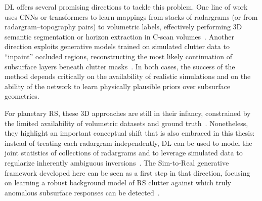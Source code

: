 DL offers several promising directions to tackle this problem.
One line of work uses CNNs or transformers to learn mappings from stacks of radargrams (or from radargram–topography pairs) to volumetric labels, effectively performing 3D semantic segmentation or horizon extraction in C-scan volumes~\cite{foss2017sharad3d,yebasse2025advances}.
Another direction exploits generative models trained on simulated clutter data to \enquote{inpaint} occluded regions, reconstructing the most likely continuation of subsurface layers beneath clutter masks~\cite{yebasse2025advances}.
In both cases, the success of the method depends critically on the availability of realistic simulations and on the ability of the network to learn physically plausible priors over subsurface geometries.

For planetary RS, these 3D approaches are still in their infancy, constrained by the limited availability of volumetric datasets and ground truth~\cite{foss2017sharad3d}.
Nonetheless, they highlight an important conceptual shift that is also embraced in this thesis: instead of treating each radargram independently, DL can be used to model the joint statistics of collections of radargrams and to leverage simulated data to regularize inherently ambiguous inversions~\cite{yebasse2025advances}.
The Sim-to-Real generative framework developed here can be seen as a first step in that direction, focusing on learning a robust background model of RS clutter against which truly anomalous subsurface responses can be detected~\cite{yebasse2025advances,Warren_2016}.

